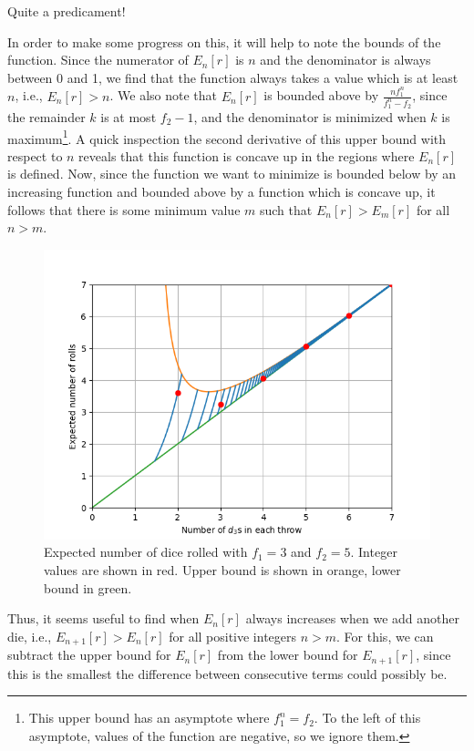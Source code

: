 \documentclass{article}
\begin{document}
Quite a predicament!
\par In order to make some progress on this, it will help to note the bounds of the function.
Since the numerator of $E_n[r]$ is $n$ and the denominator is always between 0 and 1, we find that the function always takes a value which is at least $n$, i.e., $E_n[r] > n$.
We also note that $E_n[r]$ is bounded above by $\frac{nf_1^n}{f_1^n-f_2}$, since the remainder $k$ is at most $f_2 - 1$, and the denominator is minimized when $k$ is maximum\footnote{This upper bound has an asymptote where $f_1^n=f_2$. To the left of this asymptote, values of the function are negative, so we ignore them.}.
A quick inspection the second derivative of this upper bound with respect to $n$ reveals that this function is concave up in the regions where $E_n[r]$ is defined.
Now, since the function we want to minimize is bounded below by an increasing function and bounded above by a function which is concave up, it follows that there is some minimum value $m$ such that $E_n[r] > E_m[r]$ for all $n > m$.
\begin{figure}
    \centering
    \includegraphics[scale=0.5]{num-rolls-with-bounds.png}
    \caption{Expected number of dice rolled with $f_1=3$ and $f_2=5$. Integer values are shown in red. Upper bound is shown in orange, lower bound in green.}
    \label{fig:num-rolls}
\end{figure}
Thus, it seems useful to find when $E_n[r]$ always increases when we add another die, i.e., $E_{n+1}[r] > E_n[r]$ for all positive integers $n > m$.
For this, we can subtract the upper bound for $E_n[r]$ from the lower bound for $E_{n+1}[r]$, since this is the smallest the difference between consecutive terms could possibly be.
\end{document}
